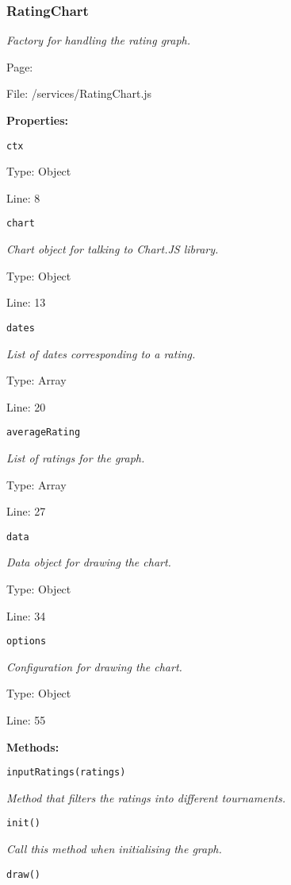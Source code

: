 \subsubsection{RatingChart}\label{RatingChart.js.doc}
\textit{Factory for handling the rating graph.}

Page: \pageref{RatingChart.js}

File: /services/RatingChart.js

\textbf{Properties:}

\texttt{ctx}

{\scriptsize
\textit{}

Type: Object

Line: 8

}
\texttt{chart}

{\scriptsize
\textit{Chart object for talking to Chart.JS library.}

Type: Object

Line: 13

}
\texttt{dates}

{\scriptsize
\textit{List of dates corresponding to a rating.}

Type: Array

Line: 20

}
\texttt{averageRating}

{\scriptsize
\textit{List of ratings for the graph.}

Type: Array

Line: 27

}
\texttt{data}

{\scriptsize
\textit{Data object for drawing the chart.}

Type: Object

Line: 34

}
\texttt{options}

{\scriptsize
\textit{Configuration for drawing the chart.}

Type: Object

Line: 55

}
\textbf{Methods:}

\texttt{inputRatings(ratings)}

{\scriptsize
\textit{Method that filters the ratings into different tournaments.}

}

\texttt{init()}

{\scriptsize
\textit{Call this method when initialising the graph.}

}

\texttt{draw()}

